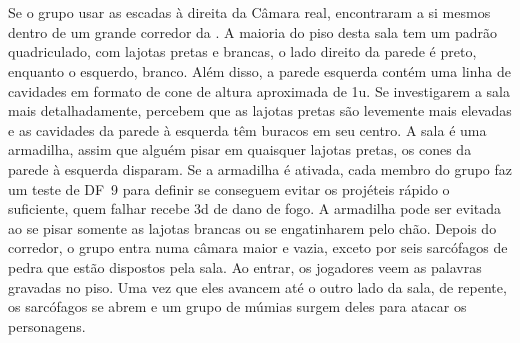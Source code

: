 {
}
%
\newpage
%
\\\\
%
Se o grupo usar as escadas à direita da Câmara real, encontraram a si mesmos dentro de um grande corredor da .
A maioria do piso desta sala tem um padrão quadriculado, com lajotas pretas e brancas, o lado direito da parede é preto, enquanto o esquerdo, branco.
Além disso, a parede esquerda contém uma linha de cavidades em formato de cone de altura aproximada de 1u.
Se investigarem a sala mais detalhadamente, percebem que as lajotas pretas são levemente mais elevadas e as cavidades da parede à esquerda têm buracos em seu centro.
A sala é uma armadilha, assim que alguém pisar em quaisquer lajotas pretas, os cones da parede à esquerda disparam.
Se a armadilha é ativada, cada membro do grupo faz um teste de DF~9 para definir se conseguem evitar os projéteis rápido o suficiente, quem falhar recebe 3d de dano de fogo.
A armadilha pode ser evitada ao se pisar somente as lajotas brancas ou se engatinharem pelo chão.
%
\vfill
%
Depois do corredor, o grupo entra numa câmara maior e vazia, exceto por seis sarcófagos de pedra que estão dispostos pela sala.
Ao entrar, os jogadores veem as palavras  gravadas no piso.
Uma vez que eles avancem até o outro lado da sala, de repente, os sarcófagos se abrem e um grupo de múmias surgem deles para atacar os personagens.
